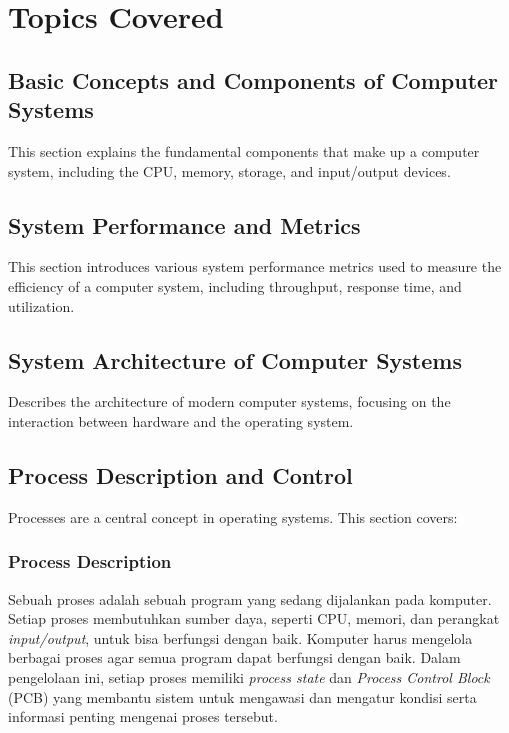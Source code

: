 \documentclass[12pt]{article}
\begin{document}
\section{Topics Covered}

\subsection{Basic Concepts and Components of Computer Systems}
This section explains the fundamental components that make up a computer system, including the CPU, memory, storage, and input/output devices.

\subsection{System Performance and Metrics}
This section introduces various system performance metrics used to measure the efficiency of a computer system, including throughput, response time, and utilization.

\subsection{System Architecture of Computer Systems}
Describes the architecture of modern computer systems, focusing on the interaction between hardware and the operating system.

\subsection{Process Description and Control}
Processes are a central concept in operating systems. This section covers:
    \subsubsection{Process Description}
    Sebuah proses adalah sebuah program yang sedang dijalankan pada komputer. Setiap proses membutuhkan sumber daya, seperti CPU, memori, dan perangkat \textit{input/output}, untuk bisa berfungsi dengan baik. Komputer harus mengelola berbagai proses agar semua program dapat berfungsi dengan baik. Dalam pengelolaan ini, setiap proses memiliki \textit{process state} dan \textit{Process Control Block} (PCB) yang membantu sistem untuk mengawasi dan mengatur kondisi serta informasi penting mengenai proses tersebut.
\end{document}
